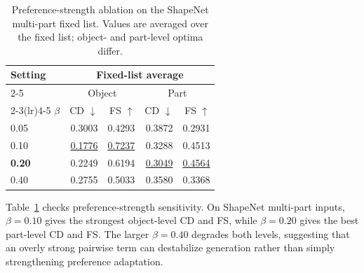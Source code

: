 \documentclass[10pt,twocolumn,letterpaper]{article}
\newcommand{\partialmetric}[1]{#1}
\newcommand{\bestpartialmetric}[1]{\underline{#1}}
\newcommand{\resulttablesize}{\scriptsize}
\newcommand{\resulttablespacing}[1]{\setlength{\tabcolsep}{#1}\renewcommand{\arraystretch}{0.92}}
\begin{document}

\begin{table}[t]
\centering
\caption{Preference-strength ablation on the ShapeNet multi-part fixed list. Values are averaged over the fixed list; object- and part-level optima differ.}
\label{tab:beta_ablation}
\resulttablespacing{3pt}
{\resulttablesize
\begin{tabular*}{0.98\columnwidth}{@{\extracolsep{\fill}}lrrrr@{}}
\toprule
Setting & \multicolumn{4}{c}{\textbf{Fixed-list average}} \\
\cmidrule(lr){2-5}
 & \multicolumn{2}{c}{Object} & \multicolumn{2}{c}{Part} \\
\cmidrule(lr){2-3}\cmidrule(lr){4-5}
$\beta$ & CD $\downarrow$ & FS $\uparrow$ & CD $\downarrow$ & FS $\uparrow$ \\
\midrule
0.05 & \partialmetric{0.3003} & \partialmetric{0.4293} & \partialmetric{0.3872} & \partialmetric{0.2931} \\
0.10 & \bestpartialmetric{0.1776} & \bestpartialmetric{0.7237} & \partialmetric{0.3288} & \partialmetric{0.4513} \\
\textbf{0.20} & \partialmetric{0.2249} & \partialmetric{0.6194} & \bestpartialmetric{0.3049} & \bestpartialmetric{0.4564} \\
0.40 & \partialmetric{0.2755} & \partialmetric{0.5033} & \partialmetric{0.3580} & \partialmetric{0.3368} \\
\bottomrule
\end{tabular*}
}
\end{table}
\vspace{-0.5em}

Table~\ref{tab:beta_ablation} checks preference-strength sensitivity. On ShapeNet multi-part inputs, $\beta=0.10$ gives the strongest object-level CD and FS, while $\beta=0.20$ gives the best part-level CD and FS. The larger $\beta=0.40$ degrades both levels, suggesting that an overly strong pairwise term can destabilize generation rather than simply strengthening preference adaptation.
\end{document}
